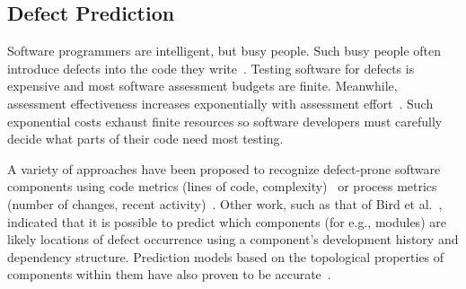 \documentclass[sigconf]{acmart}
\theoremstyle{break}
\begin{document}
\subsection{Defect Prediction}
\label{sect:review}

Software programmers are intelligent, but busy people. Such busy people often introduce  defects into 
the code they write~\cite{guo2011not}.  Testing software for defects
is expensive and most software assessment budgets are finite. Meanwhile,  assessment effectiveness increases exponentially with assessment effort~\cite{fu2016tuning}. Such exponential costs  exhaust finite resources so software developers
must carefully decide what parts of their code need most testing.


A variety of approaches have been proposed to recognize
 defect-prone  software components using code metrics (lines of code, complexity)~\cite{d2010extensive,menzies2007data, nagappan2006mining,shepperd2014researcher,menzies2010defect} or process metrics (number of changes, recent activity)~\cite{hassan2009predicting}.
Other work, such as that of 
Bird et al.~\cite{bird2009putting}, indicated that it is possible to predict which components (for e.g., modules) are likely locations of
defect occurrence using a component's development history
and dependency structure. 
Prediction models based on the topological properties
of components within them have also  proven to be  
accurate~\cite{zimmermann2008predicting}.
\end{document}
